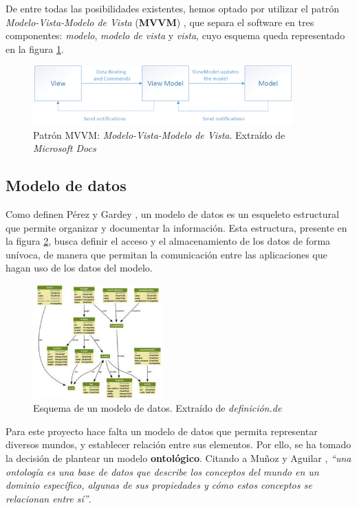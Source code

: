 De entre todas las posibilidades existentes, hemos optado por utilizar el patrón \textit{Modelo-Vista-Modelo de Vista} (\textbf{MVVM})
\autocite*{MicrosoftMVVM}, que separa el software en tres componentes: \textit{modelo}, \textit{modelo de vista} y \textit{vista}, cuyo 
esquema queda representado en la figura \ref*{mvvm}.\medskip

\begin{figure}[H]
    \centering
    \includegraphics[width=10cm]{Images/mvvm.png}
    \caption{Patrón MVVM: \textit{Modelo-Vista-Modelo de Vista}. 
    Extraído de \textit{Microsoft Docs} \autocite*{MicrosoftMVVM}}
    \label{mvvm}
\end{figure}
\newpage
\subsection{Modelo de datos} \label{Modelo_Datos}
Como definen Pérez y Gardey \autocite*{Perez2017}, un modelo de datos es un esqueleto estructural que permite organizar 
y documentar la información. Esta estructura, presente en la figura \ref*{dataModel}, busca definir el acceso y el almacenamiento de los datos de forma 
unívoca, de manera que permitan la comunicación entre las aplicaciones que hagan uso de los datos del modelo. \medskip

\begin{figure}[H]
    \centering
    \includegraphics[width=5cm]{Figures/modelo_datos.jpg}
    \caption{Esquema de un modelo de datos. Extraído de \textit{definición.de} \autocite*{Perez2017}}
    \label{dataModel}
\end{figure}

Para este proyecto hace falta un modelo de datos que permita representar diversos mundos, y establecer relación entre sus elementos.
Por ello, se ha tomado la decisión de plantear un modelo \textbf{ontológico}. Citando a Muñoz y Aguilar \autocite*{Munoz2009}, 
\textit{“una ontología es una base de datos que describe los conceptos del mundo en un dominio específico, algunas de sus 
propiedades y cómo estos conceptos se relacionan entre sí”}. \autocite*{Munoz2009}
 
